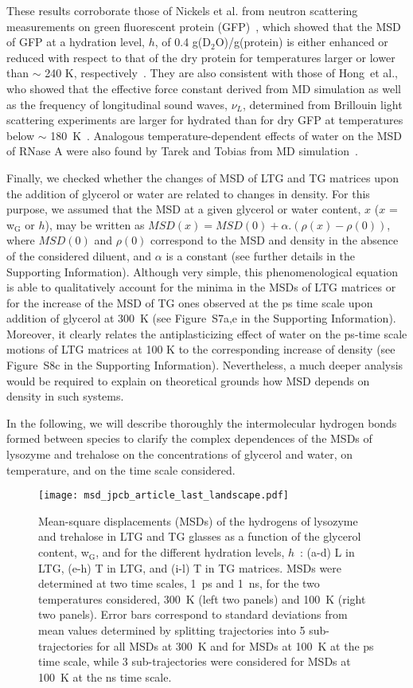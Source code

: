 \documentclass[journal=jpcbfk,manuscript=article]{achemso}
\begin{document}
\begin{singlespacing}
These results corroborate those of Nickels et al. from neutron scattering measurements on green fluorescent protein 
(GFP)~\cite{Nickels2012}, which showed that the MSD of GFP at a hydration level, $h$, of 0.4 g(D$_2$O)/g(protein)
is either enhanced or reduced with respect to that of the dry protein for temperatures larger or lower than
$\sim$ 240 K, respectively~\cite{Nickels2012}. They are also consistent with those of Hong~et al., who showed that the effective
force constant derived from MD simulation as well as the frequency of longitudinal sound waves, $\nu_{L}$, determined from 
Brillouin light scattering experiments are larger for hydrated than for dry GFP at temperatures below $\sim$ 180~K~\cite{Hong2013}.
Analogous temperature-dependent effects of water on the MSD of RNase A were also found by Tarek and Tobias from MD 
simulation~\cite{Tarek2008}.

Finally, we checked whether the changes of MSD of LTG and TG matrices upon the addition of glycerol or water 
are related to changes in density. For this purpose, we assumed that the MSD at a given glycerol or water content, $x$
($x$ = w$_{\textrm{G}}$ or $h$), may be written as $MSD(x) = MSD(0)+\alpha.(\rho(x)-\rho(0))$, where $MSD(0)$ and $\rho(0)$
correspond to the MSD and density in the absence of the considered diluent, and $\alpha$ is a constant 
(see further details in the Supporting Information). Although very simple, this phenomenological equation is able to 
qualitatively account for the minima in the MSDs of LTG matrices or for the increase of the MSD of TG ones observed at the ps 
time scale upon addition of glycerol at 300~K (see Figure~S7a,e in the Supporting Information). Moreover, it clearly relates the 
antiplasticizing effect of water on the ps-time scale motions of LTG matrices at 100 K to the corresponding increase of density 
(see Figure~S8c in the Supporting Information). Nevertheless, a much deeper analysis would be required to explain on
theoretical grounds how MSD depends on density in such systems.

In the following, we will describe thoroughly the intermolecular hydrogen bonds formed between species 
to clarify the complex dependences of the MSDs of lysozyme and trehalose on the concentrations of glycerol and water,
on temperature, and on the time scale considered.

\begin{figure}[htbp]
\texttt{[image: msd\_jpcb\_article\_last\_landscape.pdf]}
\caption{
\label{msd}
Mean-square displacements (MSDs) of the hydrogens of lysozyme and trehalose in LTG and TG glasses 
as a function of the glycerol content, w$_{\textrm{G}}$, and for the different hydration levels, $h$~:
(a-d) L in LTG, (e-h) T in LTG, and (i-l) T in TG matrices. MSDs were determined at two time scales, 1~ps and 1~ns, 
for the two temperatures considered, 300~K (left two panels) and 100~K (right two panels). Error bars correspond 
to standard deviations from mean values determined by splitting trajectories into 5 sub-trajectories for all MSDs 
at 300~K and for MSDs at 100~K at the ps time scale, while 3 sub-trajectories were considered for MSDs at 100~K at the 
ns time scale.
}
\end{figure}



\end{singlespacing}
\end{document}
